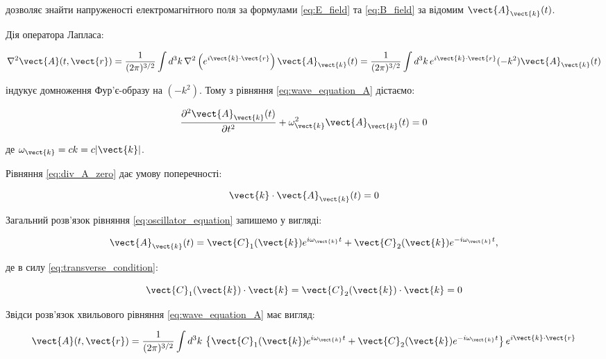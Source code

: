 дозволяє знайти напруженості електромагнітного поля за формулами \eqref{eq:E_field} та \eqref{eq:B_field} за відомим \(\vect{A}_{\vect{k}}(t)\).

Дія оператора Лапласа:

\begin{equation*}
\nabla^2 \vect{A}(t, \vect{r}) = \frac{1}{(2\pi)^{3/2}} \int d^3k \, \nabla^2 \left( e^{i\vect{k} \cdot \vect{r}} \right) \vect{A}_{\vect{k}}(t) =
\frac{1}{(2\pi)^{3/2}} \int d^3k \, e^{i\vect{k} \cdot \vect{r}} (-k^2) \vect{A}_{\vect{k}}(t)
\end{equation*}

індукує домноження Фур’є-образу на \((-k^2)\). Тому з рівняння \eqref{eq:wave_equation_A} дістаємо:

\begin{equation}
\frac{\partial^2 \vect{A}_{\vect{k}}(t)}{\partial t^2} + \omega_{\vect{k}}^2 \vect{A}_{\vect{k}}(t) = 0
\label{eq:oscillator_equation}
\end{equation}

де \(\omega_{\vect{k}} = ck = c|\vect{k}|\).

Рівняння \eqref{eq:div_A_zero} дає умову поперечності:

\begin{equation}
\vect{k} \cdot \vect{A}_{\vect{k}}(t) = 0
\label{eq:transverse_condition}
\end{equation}

Загальний розв’язок рівняння \eqref{eq:oscillator_equation} запишемо у вигляді:

\begin{equation}
\vect{A}_{\vect{k}}(t) = \vect{C}_1(\vect{k}) e^{i\omega_{\vect{k}} t} + \vect{C}_2(\vect{k}) e^{-i\omega_{\vect{k}} t},
\label{eq:general_solution_Ak}
\end{equation}

де в силу \eqref{eq:transverse_condition}:

\begin{equation*}
\vect{C}_1(\vect{k}) \cdot \vect{k} = \vect{C}_2(\vect{k}) \cdot \vect{k} = 0
\end{equation*}

Звідси розв’язок хвильового рівняння \eqref{eq:wave_equation_A} має вигляд:

\begin{equation}
\vect{A}(t, \vect{r}) = \frac{1}{(2\pi)^{3/2}} \int d^3k \, \left\{ \vect{C}_1(\vect{k}) e^{i\omega_{\vect{k}} t} + \vect{C}_2(\vect{k})
e^{-i\omega_{\vect{k}} t} \right\} e^{i\vect{k} \cdot \vect{r}}
\label{eq:general_solution_A}
\end{equation}

